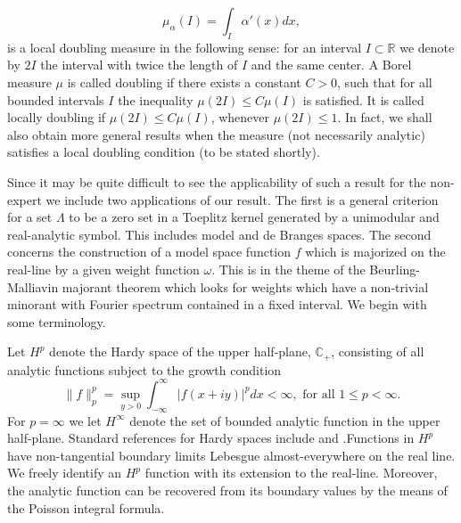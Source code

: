 \documentclass{article}[12pt]
\newcommand{\norm}[1]{\lVert#1\rVert}
\theoremstyle{remark}
\begin{document}
\begin{equation*}
    \mu_{\alpha}(I) = \int_{I} \alpha'(x)dx,
\end{equation*}
is a local doubling measure in the following sense: for an interval $I \subset \mathbb{R}$ we denote by $2I$ the interval with twice the length of $I$ and the same center. A Borel measure $\mu$ is called doubling if there exists a constant $C > 0$, such that for all bounded intervals $I$ the inequality $\mu(2I) \leq C\mu(I)$ is satisfied. It is called locally doubling if $\mu(2I) \leq C\mu(I)$, whenever $\mu(2I) \leq 1$. In fact, we shall also obtain more general results when the measure (not necessarily analytic) satisfies a local doubling condition (to be stated shortly).\newline

Since it may be quite difficult to see the applicability of such a result for the non-expert we include two applications of our result. The first is a general criterion for a set $\Lambda$ to be a zero set in a Toeplitz kernel generated by a unimodular and real-analytic symbol. This includes model and de Branges spaces. The second concerns the construction of a model space function $f$ which is majorized on the real-line by a given weight function $\omega$. This is in the theme of the Beurling-Malliavin majorant theorem which looks for weights which have a non-trivial minorant with Fourier spectrum contained in a fixed interval. We begin with some terminology.\newline

Let $H^{p}$ denote the Hardy space of the upper half-plane, $\mathbb{C}_{+}$, consisting of all analytic functions subject to the growth condition
\begin{equation*}
    \norm{f}_{p}^{p} = \sup_{y > 0} \int_{-\infty}^{\infty} \lvert f(x+iy) \rvert^{p}dx < \infty, \text{ for all } 1 \leq p < \infty.
\end{equation*}
For $p = \infty$ we let $H^{\infty}$ denote the set of bounded analytic function in the upper half-plane. Standard references for Hardy spaces include \cite{MR2261424} and \cite{MR1669574}.Functions in $H^{p}$ have non-tangential boundary limits Lebesgue almost-everywhere on the real line. We freely identify an $H^{p}$ function with its extension to the real-line. Moreover, the analytic function can be recovered from its boundary values by the means of the Poisson integral formula.\newline
\end{document}
